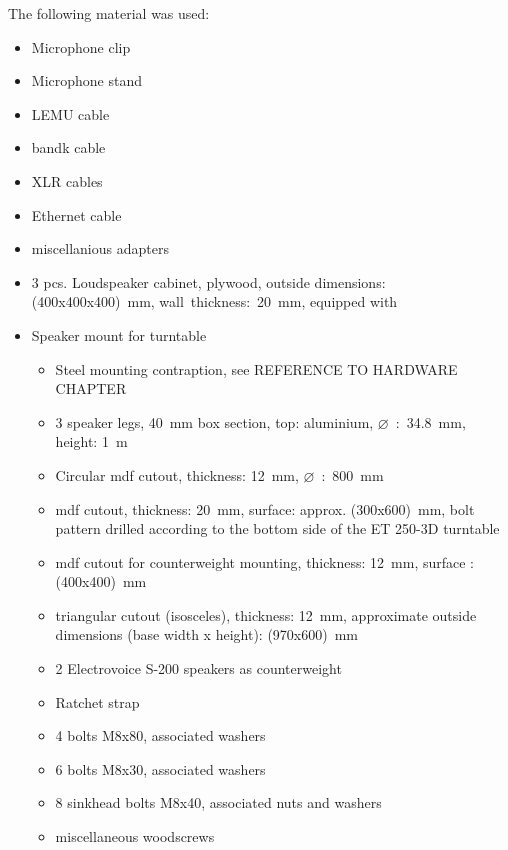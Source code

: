 The following material was used:
\begin{itemize}[noitemsep]
\item Microphone clip
\item Microphone stand
\item LEMU cable
\item \gls{bandk} cable
\item XLR cables
\item Ethernet cable
\item miscellanious adapters
\item 3 pcs. Loudspeaker cabinet, plywood, outside dimensions: (400x400x400)\SI{}{\milli\meter}, wall~thickness:~\SI{20}{\milli\meter}, equipped with \citep{seas33}
\item Speaker mount for turntable
\begin{itemize}[noitemsep]
\item Steel mounting contraption, see REFERENCE TO HARDWARE CHAPTER
\item 3 speaker legs, \SI{40}{\milli\meter} box section, top: aluminium, {\(\varnothing\)~:~\SI{34.8}{\milli\meter}}, height: \SI{1}{\meter}
\item Circular \gls{mdf} cutout, thickness: \SI{12}{\milli\meter}, {\(\varnothing\)~:~\SI{800}{\milli\meter}}
\item \gls{mdf} cutout, thickness: \SI{20}{\milli\meter}, surface: approx. (300x600)\SI{}{\milli\meter}, bolt pattern drilled according to the bottom side of the ET 250-3D turntable
\item \gls{mdf} cutout for counterweight mounting, thickness: \SI{12}{\milli\meter}, surface : (400x400)\SI{}{\milli\meter}
\item triangular cutout (isosceles), thickness: \SI{12}{\milli\meter}, approximate outside dimensions (base width x height): (970x600)\SI{}{\milli\meter}
\item 2 Electrovoice S-200 speakers as counterweight
\item Ratchet strap
\item 4 bolts M8x80, associated washers
\item 6 bolts M8x30, associated washers
\item 8 sinkhead bolts M8x40, associated nuts and washers
\item miscellaneous woodscrews

\end{itemize}
\end{itemize}



